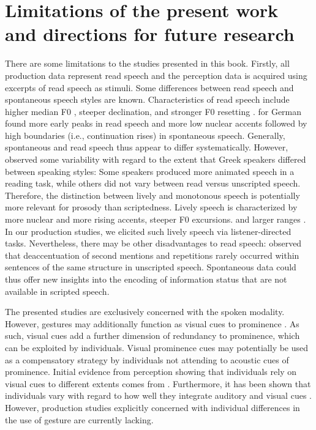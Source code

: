 \section{Limitations of the present work and directions for future research}

There are some limitations to the studies presented in this book. Firstly, all production data represent read speech and the perception data is acquired using excerpts of read speech as stimuli. Some differences between read speech and spontaneous speech styles are known. Characteristics of read speech include higher median F0 \citep[English:][]{hazanDoesReadingClearly2010}, steeper declination, and stronger F0 resetting \citep[Swedish:][]{swertsF0DeclinationReadaloud1996}. \citet{baumannCoreferenceLexicalGivenness2013} for German found more early peaks in read speech and more low nuclear accents followed by high boundaries (i.e., continuation rises) in spontaneous speech. Generally, spontaneous and read speech thus appear to differ systematically. However, \citet{grylliaManyShapes2022} observed some variability with regard to the extent that Greek speakers differed between speaking styles: Some speakers produced more animated speech in a reading task, while others did not vary between read versus unscripted speech. Therefore, the distinction between lively and monotonous speech is potentially more relevant for prosody than scriptedness. Lively speech is characterized by more nuclear and more rising accents, steeper F0 excursions. and larger ranges \citep{baumannInformativenessSpeakingStyle2019, chodroffInformationStructureAffect2018}. In our production studies, we elicited such lively speech via listener-directed tasks. Nevertheless, there may be other disadvantages to read speech: \citet{bardDissociationDeaccentingGivenness1999} observed that deaccentuation of second mentions and repetitions rarely occurred within sentences of the same structure in unscripted speech. Spontaneous data could thus offer new insights into the encoding of information status that are not available in scripted speech. 

The presented studies are exclusively concerned with the spoken modality. However, gestures may additionally function as visual cues to prominence \citep{krahmerEffectsVisualBeats2007, ambrazaitisMultimodalProminencesExploring2017, esteve-gibertTimingHeadMovements2017, rohrerVisualizingProsodicStructure2023}. As such, visual cues add a further dimension of redundancy to prominence, which can be exploited by individuals.
Visual prominence cues may potentially be used as a compensatory strategy by individuals not attending to acoustic cues of prominence. Initial evidence from perception showing that individuals rely on visual cues to different extents comes from \citet{bujokAudiovisualPerceptionLexical2024}. Furthermore, it has been shown that individuals vary with regard to how well they integrate auditory and visual cues \citep[e.g.,][]{wilbiksSpeechNonspeechMeasures2022}. However, production studies explicitly  concerned with individual differences in the use of gesture are currently lacking.

